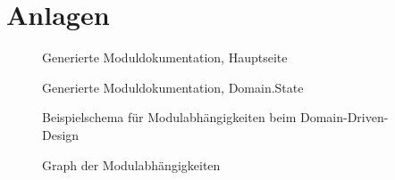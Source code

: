 \section{Anlagen} \label{Anlagen}

\begin{figure}[ht]
    \caption{Generierte Moduldokumentation, Hauptseite}
    \label{module-doc-index}
\end{figure}

\begin{figure}[ht]
    \caption{Generierte Moduldokumentation, Domain.State}
    \label{module-doc-state}
\end{figure}

\begin{figure}[ht]
    \caption{Beispielschema für Modulabhängigkeiten beim Domain-Driven-Design \cite{domain-driven-design}}
    \label{domain-driven-design-layers}
    \centering{}
\end{figure}

\begin{figure}[ht]
    \caption{Graph der Modulabhängigkeiten}
    \label{module-dependency-graph}
    \centering{}
\end{figure}